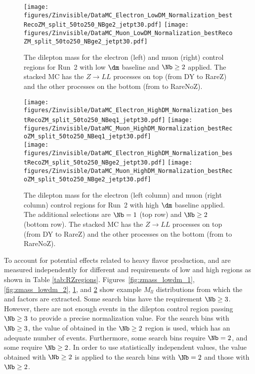 \begin{figure}[tbp]
{
\centering
\texttt{[image: figures/Zinvisible/DataMC\_Electron\_LowDM\_Normalization\_bestRecoZM\_split\_50to250\_NBge2\_jetpt30.pdf]}
\texttt{[image: figures/Zinvisible/DataMC\_Muon\_LowDM\_Normalization\_bestRecoZM\_split\_50to250\_NBge2\_jetpt30.pdf]}
\caption[The dilepton mass for the electron and muon control regions for Run~2 with low $\dm$ baseline applied]
{
    The dilepton mass for the electron (left) and muon (right) control regions for Run~2 with low $\dm$ baseline and $\Nb\ge2$ applied.
    The stacked MC has the $Z \to LL$ processes on top (from DY to RareZ) and the other processes on the bottom (from \ttbar to RareNoZ).
}
\label{fig:zmass_lowdm_3}
}
\end{figure}

\begin{figure}[tbp]
{
\centering
\texttt{[image: figures/Zinvisible/DataMC\_Electron\_HighDM\_Normalization\_bestRecoZM\_split\_50to250\_NBeq1\_jetpt30.pdf]}
\texttt{[image: figures/Zinvisible/DataMC\_Muon\_HighDM\_Normalization\_bestRecoZM\_split\_50to250\_NBeq1\_jetpt30.pdf]} \\
\texttt{[image: figures/Zinvisible/DataMC\_Electron\_HighDM\_Normalization\_bestRecoZM\_split\_50to250\_NBge2\_jetpt30.pdf]}
\texttt{[image: figures/Zinvisible/DataMC\_Muon\_HighDM\_Normalization\_bestRecoZM\_split\_50to250\_NBge2\_jetpt30.pdf]} \\
\caption[The dilepton mass for the electron and muon control regions for Run~2 with high $\dm$ baseline applied]
{
    The dilepton mass for the electron (left column) and muon (right column) control regions for Run~2 with high $\dm$ baseline applied.
    The additional selections are $\Nb=1$ (top row) and $\Nb\ge2$ (bottom row).
    The stacked MC has the $Z \to LL$ processes on top (from DY to RareZ) and the other processes on the bottom (from \ttbar to RareNoZ).
}
\label{fig:zmass_highdm}
}
\end{figure}

To account for potential effects related to heavy flavor production, \Rz and \Rt are measured independently for different \Nb and \Nsv requirements of low \dm and high \dm regions as shown in Table \ref{tab:RZregions}.
Figures~\ref{fig:zmass_lowdm_1}, \ref{fig:zmass_lowdm_2}, \ref{fig:zmass_lowdm_3}, and \ref{fig:zmass_highdm} show example $M_{ll}$ distributions from which the \Rz and \Rt factors are extracted.
Some search bins have the requirement $\Nb\geq3$.
However, there are not enough events in the dilepton control region passing $\Nb\geq3$ to provide a precise normalization value.
For the search bins with $\Nb\geq3$, the value of \Rz obtained in the $\Nb\geq2$ region is used, which has an adequate number of events.
Furthermore, some search bins require $\Nb=2$, and some require $\Nb\geq2$.
In order to use statistically independent \Rz values, the \Rz value obtained with $\Nb\geq2$ is applied to the search bins with $\Nb=2$ and those with $\Nb\geq2$.


